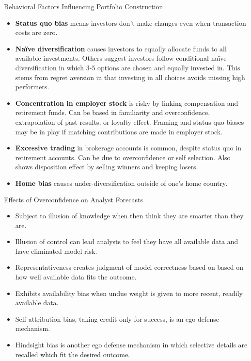 \documentclass[../custom]{flashcards}
\newcommand{\studyArea}{Behavioral Finance}
\begin{document}
\begin{flashcard}[\studyArea]{Behavioral Factors Influencing Portfolio Construction}
    \begin{itemize}
        \item \textbf{Status quo bias} means investors don't make changes even when transaction costs are zero.
        \item \textbf{Na\"{i}ve diversification} causes investors to equally allocate funds to all available investments. Others suggest investors follow conditional na\"{i}ve diversification in which 3-5 options are chosen and equally invested in. This stems from regret aversion in that investing in all choices avoids missing high performers.
        \item \textbf{Concentration in employer stock} is risky by linking compensation and retirement funds. Can be based in familiarity and overconfidence, extrapolation of past results, or loyalty effect. Framing and status quo biases may be in play if matching contributions are made in employer stock.
        \item \textbf{Excessive trading} in brokerage accounts is common, despite status quo in retirement accounts. Can be due to overconfidence or self selection. Also shows disposition effect by selling winners and keeping losers.
        \item \textbf{Home bias} causes under-diversification outside of one's home country.
    \end{itemize}
\end{flashcard}

\begin{flashcard}[\studyArea]{Effects of Overconfidence on Analyst Forecasts}
    \begin{itemize}
        \item Subject to illusion of knowledge when then think they are smarter than they are.
        \item Illusion of control can lead analysts to feel they have all available data and have eliminated model risk.
        \item Representativeness creates judgment of model correctness based on based on how well available data fits the outcome.
        \item Exhibits availability bias when undue weight is given to more recent, readily available data.
        \item Self-attribution bias, taking credit only for success, is an ego defense mechanism.
        \item Hindsight bias is another ego defense mechanism in which selective details are recalled which fit the desired outcome.
    \end{itemize}
\end{flashcard}
\end{document}
